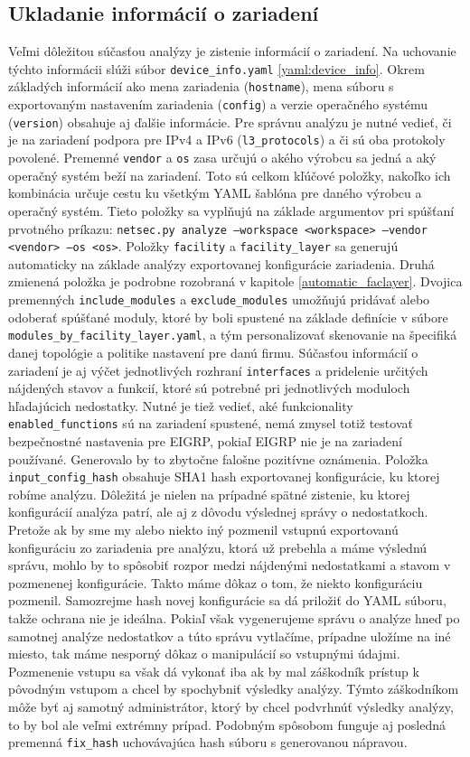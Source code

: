 \subsection{Ukladanie informácií o zariadení}
Veľmi dôležitou súčasťou analýzy je zistenie informácií o zariadení. Na uchovanie týchto informácii slúži súbor \texttt{device\_info.yaml} \ref{yaml:device_info}. Okrem základých informácií ako mena zariadenia (\texttt{hostname}), mena súboru s exportovaným nastavením zariadenia (\texttt{config}) a verzie operačného systému (\texttt{version}) obsahuje aj ďalšie informácie. Pre správnu analýzu je nutné vedieť, či je na zariadení podpora pre IPv4 a IPv6 (\texttt{l3\_protocols}) a či sú oba protokoly povolené. Premenné \texttt{vendor} a \texttt{os} zasa určujú o akého výrobcu sa jedná a aký operačný systém beží na zariadení. Toto sú celkom kľúčové položky, nakoľko ich kombinácia určuje cestu ku všetkým YAML šablóna pre daného výrobcu a operačný systém. Tieto položky sa vyplňujú na základe argumentov pri spúšťaní prvotného príkazu: \texttt{netsec.py analyze ---workspace <workspace> ---vendor <vendor> ---os <os>}. Položky \texttt{facility} a \texttt{facility\_layer} sa generujú automaticky na základe analýzy exportovanej konfigurácie zariadenia. Druhá zmienená položka je podrobne rozobraná v kapitole \ref{automatic_faclayer}. Dvojica premenných \texttt{include\_modules} a \texttt{exclude\_modules} umožňujú pridávať alebo odoberať spúšťané moduly, ktoré by boli spustené na základe definície v súbore \texttt{modules\_by\_facility\_layer.yaml}, a tým personalizovať skenovanie na špecifiká danej topológie a politike nastavení pre danú firmu. Súčasťou informácií o zariadení je aj výčet jednotlivých rozhraní \texttt{interfaces} a pridelenie určitých nájdených stavov a funkcií, ktoré sú potrebné pri jednotlivých moduloch hľadajúcich nedostatky. Nutné je tiež vedieť, aké funkcionality \texttt{enabled\_functions} sú na zariadení spustené, nemá zmysel totiž testovať bezpečnostné nastavenia pre EIGRP, pokiaľ EIGRP nie je na zariadení používané. Generovalo by to zbytočne falošne pozitívne oznámenia. Položka \texttt{input\_config\_hash} obsahuje SHA1 hash exportovanej konfigurácie, ku ktorej robíme analýzu. Dôležitá je nielen na prípadné spätné zistenie, ku ktorej konfigurácií analýza patrí, ale aj z dôvodu výslednej správy o nedostatkoch. Pretože ak by sme my alebo niekto iný pozmenil vstupnú exportovanú konfiguráciu zo zariadenia pre analýzu, ktorá už prebehla a máme výslednú správu, mohlo by to spôsobiť rozpor medzi nájdenými nedostatkami a stavom v pozmenenej konfigurácie. Takto máme dôkaz o tom, že niekto konfiguráciu pozmenil. Samozrejme hash novej konfigurácie sa dá priložiť do YAML súboru, takže ochrana nie je ideálna. Pokiaľ však vygenerujeme správu o analýze hneď po samotnej analýze nedostatkov a túto správu vytlačíme, prípadne uložíme na iné miesto, tak máme nesporný dôkaz o manipulácií so vstupnými údajmi. Pozmenenie vstupu sa však dá vykonať iba ak by mal záškodník prístup k pôvodným vstupom a chcel by spochybniť výsledky analýzy. Týmto záškodníkom môže byť aj samotný administrátor, ktorý by chcel podvrhnúť výsledky analýzy, to by bol ale veľmi extrémny prípad. Podobným spôsobom funguje aj posledná premenná \texttt{fix\_hash} uchovávajúca hash súboru s generovanou nápravou.  

